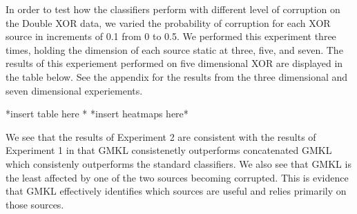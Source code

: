 \documentclass{article}
\begin{document}
In order to test how the classifiers perform with different level of corruption on the Double XOR data, we varied the probability of corruption for each XOR source in increments of 0.1 from 0 to 0.5. We performed this experiment three times, holding the dimension of each source static at three, five, and seven. The results of this experiement performed on five dimensional XOR are displayed in the table below. See the appendix for the results from the three dimensional and seven dimensional experiements.

*insert table here *
*insert heatmaps here*

We see that the results of Experiment 2 are consistent with the results of Experiment 1 in that GMKL consistenetly outperforms concatenated GMKL which consistenly outperforms the standard classifiers. We also see that GMKL is the least affected by one of the two sources becoming corrupted. This is evidence that GMKL effectively identifies which sources are useful and relies primarily on those sources. 
\end{document}
